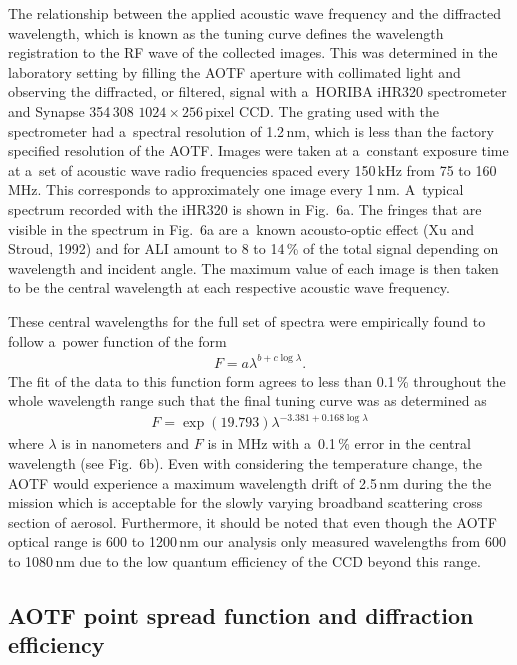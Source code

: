 \documentclass[amtd, online, hvmath]{copernicus}
\begin{document}
The relationship between the applied acoustic wave frequency and the
diffracted wavelength, which is known as the tuning curve defines the
wavelength registration to the RF wave of the collected images. This
was determined in the laboratory setting by filling the AOTF aperture
with collimated light and observing the diffracted, or filtered,
signal with a~HORIBA iHR320 spectrometer and Synapse 354\,308
$1024\times 256$\,pixel CCD. The grating used with the spectrometer
had a~spectral resolution of 1.2\,\unit{nm}, which is less than
the factory specified resolution of the AOTF. Images were taken at
a~constant exposure time at a~set of acoustic wave radio frequencies
spaced every 150\,\unit{kHz} from 75 to 160\,\unit{MHz}. This
corresponds to approximately one image every 1\,\unit{nm}. A~typical
spectrum recorded with the iHR320 is shown in Fig.~6a. The fringes
that are visible in the spectrum in Fig.~6a are a~known acousto-optic
effect (Xu and Stroud, 1992) and for ALI amount to 8 to 14\,{\%} of
the total signal depending on wavelength and incident angle. The
maximum value of each image is then taken to be the central wavelength
at each respective acoustic wave frequency.

These central wavelengths for the full set of spectra were empirically
found to follow a~power function of the form
\begin{align}
F=a\lambda^{b+c\log \lambda}.
\end{align}
The fit of the data to this function form agrees to less than
0.1\,{\%} throughout the whole wavelength range such that the final
tuning curve was as determined as
\begin{align}
F=\exp \left(19.793 \right)\lambda^{-3.381+0.168\log \lambda}
\end{align}
where $\lambda$ is in nanometers and $F$ is in MHz with a~0.1\,{\%}
error in the central wavelength (see Fig.~6b). Even with considering the temperature change, the AOTF would experience a maximum wavelength drift of 2.5\,nm during the the mission which is acceptable for the slowly varying broadband scattering cross section of aerosol. Furthermore, it should be noted that
even though the AOTF optical range is 600 to 1200\,\unit{nm} our
analysis only measured wavelengths from 600 to 1080\,\unit{nm} due to
the low quantum efficiency of the CCD beyond this range.

\subsection{AOTF point spread function and diffraction efficiency}
\end{document}
